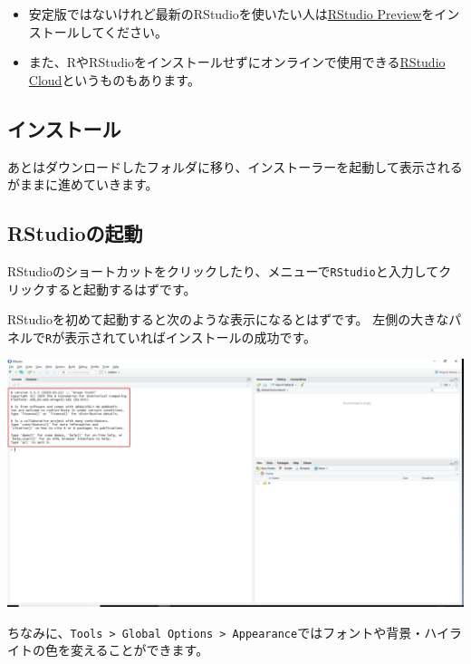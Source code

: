 \documentclass[]{bxjsreport}
\providecommand{\tightlist}{%
  \setlength{\itemsep}{0pt}\setlength{\parskip}{0pt}}
\let\asdf\section
\renewcommand{\section}{\chapter}
\let\asdff\subsection
\renewcommand{\subsection}{\asdf}
\renewcommand{\subsubsection}{\asdff}
\begin{document}
\begin{itemize}
\tightlist
\item
  安定版ではないけれど最新のRStudioを使いたい人は\href{https://www.rstudio.com/products/rstudio/download/preview/}{RStudio Preview}をインストールしてください。
\item
  また、RやRStudioをインストールせずにオンラインで使用できる\href{https://rstudio.cloud/}{RStudio Cloud}というものもあります。
\end{itemize}

\hypertarget{ux30a4ux30f3ux30b9ux30c8ux30fcux30eb-1}{%
\subsubsection{インストール}\label{ux30a4ux30f3ux30b9ux30c8ux30fcux30eb-1}}

あとはダウンロードしたフォルダに移り、インストーラーを起動して表示されるがままに進めていきます。

\hypertarget{rstudioux306eux8d77ux52d5}{%
\subsubsection{RStudioの起動}\label{rstudioux306eux8d77ux52d5}}

RStudioのショートカットをクリックしたり、メニューで\texttt{RStudio}と入力してクリックすると起動するはずです。

RStudioを初めて起動すると次のような表示になるとはずです。
左側の大きなパネルで\texttt{R}が表示されていればインストールの成功です。

\includegraphics{figures/Rstudio3.jpg}

ちなみに、\texttt{Tools\ \textgreater{}\ Global\ Options\ \textgreater{}\ Appearance}ではフォントや背景・ハイライトの色を変えることができます。
\end{document}
